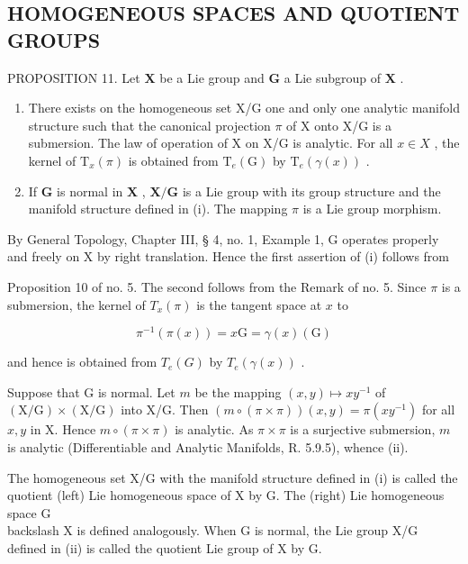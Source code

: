 \subsection{HOMOGENEOUS SPACES AND QUOTIENT GROUPS}

PROPOSITION 11. Let \(\mathbf{X}\) be a Lie group and \(\mathbf{G}\) a Lie subgroup of \(\mathbf{X}\) .

\begin{enumerate}
\def\labelenumi{(\roman{enumi})}
\item
  There exists on the homogeneous set X/G one and only one analytic manifold structure such that the canonical projection \(\pi\) of X onto X/G is a submersion. The law of operation of X on X/G is analytic. For all \(x \in X\) , the kernel of \(\mathrm{T}_{x}(\pi)\) is obtained from \(\mathrm{T}_{e}(\mathrm{G})\) by \(\mathrm{T}_{e}(\gamma(x))\) .
\item
  If \(\mathbf{G}\) is normal in \(\mathbf{X}\) , \(\mathbf{X} / \mathbf{G}\) is a Lie group with its group structure and the manifold structure defined in (i). The mapping \(\pi\) is a Lie group morphism.
\end{enumerate}

By General Topology, Chapter III, § 4, no. 1, Example 1, G operates properly and freely on X by right translation. Hence the first assertion of (i) follows from

Proposition 10 of no. 5. The second follows from the Remark of no. 5. Since \(\pi\) is a submersion, the kernel of \(T_{x}(\pi)\) is the tangent space at \(x\) to

\[
\pi^ {- 1} (\pi (x)) = x \mathrm{G} = \gamma (x) (\mathrm{G})
\]

and hence is obtained from \(T_{e}(G)\) by \(T_{e}(\gamma(x))\) .

Suppose that G is normal. Let \(m\) be the mapping \((x,y)\mapsto xy^{-1}\) of \((\mathrm{X / G})\times (\mathrm{X / G})\) into X/G. Then \((m\circ (\pi \times \pi))(x,y) = \pi (xy^{-1})\) for all \(x,y\) in X. Hence \(m\circ (\pi \times \pi)\) is analytic. As \(\pi \times \pi\) is a surjective submersion, \(m\) is analytic (Differentiable and Analytic Manifolds, R. 5.9.5), whence (ii).

The homogeneous set X/G with the manifold structure defined in (i) is called the quotient (left) Lie homogeneous space of X by G. The (right) Lie homogeneous space G\\backslash X is defined analogously. When G is normal, the Lie group X/G defined in (ii) is called the quotient Lie group of X by G.

